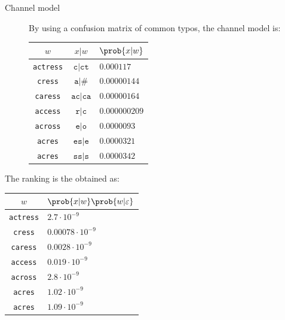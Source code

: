 \begin{example}
\begin{description}
        \item[Channel model] 
            By using a confusion matrix of common typos, the channel model is:
            \begin{table}[H]
                \centering
                \footnotesize
                \begin{tabular}{ccl}
                    \toprule
                    $w$ & $x | w$ & $\prob{x | w}$ \\
                    \midrule
                    \texttt{actress} & $\texttt{c}|\texttt{ct}$  & $0.000117$ \\
                    \texttt{cress}   & $\texttt{a}|\texttt{\#}$  & $0.00000144$ \\
                    \texttt{caress}  & $\texttt{ac}|\texttt{ca}$ & $0.00000164$ \\
                    \texttt{access}  & $\texttt{r}|\texttt{c}$   & $0.000000209$ \\
                    \texttt{across}  & $\texttt{e}|\texttt{o}$   & $0.0000093$ \\
                    \texttt{acres}   & $\texttt{es}|\texttt{e}$  & $0.0000321$ \\
                    \texttt{acres}   & $\texttt{ss}|\texttt{s}$  & $0.0000342$ \\
                    \bottomrule
                \end{tabular}
            \end{table}
    \end{description}

    The ranking is the obtained as:
    \begin{table}[H]
        \centering
        \footnotesize
        \begin{tabular}{cl}
            \toprule
            $w$ & $\prob{x | w} \prob{w | \varepsilon}$ \\
            \midrule
            \texttt{actress} & $2.7 \cdot 10^{-9}$ \\
            \texttt{cress}   & $0.00078 \cdot 10^{-9}$ \\
            \texttt{caress}  & $0.0028 \cdot 10^{-9}$ \\
            \texttt{access}  & $0.019 \cdot 10^{-9}$ \\
            \texttt{across}  & $2.8 \cdot 10^{-9}$ \\
            \texttt{acres}   & $1.02 \cdot 10^{-9}$ \\
            \texttt{acres}   & $1.09 \cdot 10^{-9}$ \\
            \bottomrule
        \end{tabular}
    \end{table}


\end{example}
